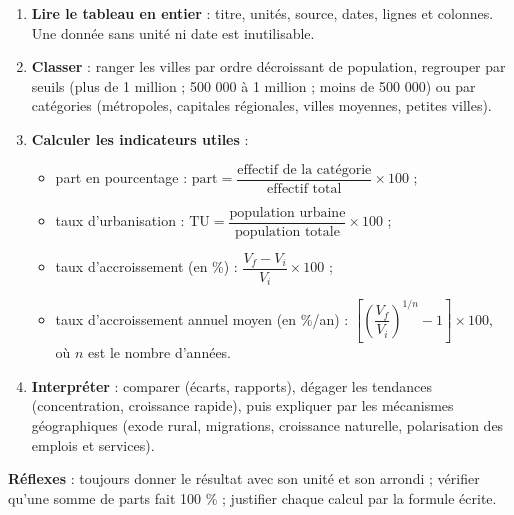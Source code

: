 \documentclass[11pt]{article}
\begin{document}
\begin{methode}
\begin{enumerate}
\item \textbf{Lire le tableau en entier} : titre, unités, source, dates, lignes et colonnes. Une donnée sans unité ni date est inutilisable.
\item \textbf{Classer} : ranger les villes par ordre décroissant de population, regrouper par seuils (plus de 1 million ; 500 000 à 1 million ; moins de 500 000) ou par catégories (métropoles, capitales régionales, villes moyennes, petites villes).
\item \textbf{Calculer les indicateurs utiles} :
\begin{itemize}
\item part en pourcentage : $\text{part} = \dfrac{\text{effectif de la catégorie}}{\text{effectif total}} \times 100$ ;
\item taux d'urbanisation : $\text{TU} = \dfrac{\text{population urbaine}}{\text{population totale}} \times 100$ ;
\item taux d'accroissement (en \%) : $\dfrac{V_f - V_i}{V_i} \times 100$ ;
\item taux d'accroissement annuel moyen (en \%/an) : $\left[\left(\dfrac{V_f}{V_i}\right)^{1/n} - 1\right] \times 100$, où $n$ est le nombre d'années.
\end{itemize}
\item \textbf{Interpréter} : comparer (écarts, rapports), dégager les tendances (concentration, croissance rapide), puis expliquer par les mécanismes géographiques (exode rural, migrations, croissance naturelle, polarisation des emplois et services).
\end{enumerate}
\textbf{Réflexes} : toujours donner le résultat avec son unité et son arrondi ; vérifier qu'une somme de parts fait 100 \% ; justifier chaque calcul par la formule écrite.
\end{methode}
\end{document}
